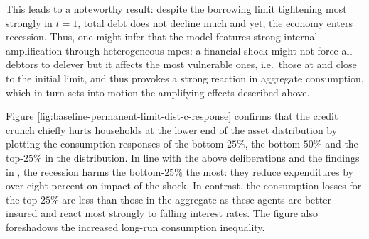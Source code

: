 \documentclass[a4paper,12pt]{article} %
\numberwithin{equation}{section} %
\numberwithin{figure}{section}
\numberwithin{table}{section}
\begin{document}

This leads to a noteworthy result: despite the borrowing limit tightening most strongly in $t=1$, total debt does not decline much and yet, the economy enters recession. Thus, one might infer that the model features strong internal amplification through heterogeneous \Gls{mpc}s: a financial shock might not force all debtors to delever but it affects the most vulnerable ones, i.e.~those at and close to the initial limit, and thus provokes a strong reaction in aggregate consumption, which in turn sets into motion the amplifying effects described above.

Figure \ref{fig:baseline-permanent-limit-dist-c-response} confirms that the credit crunch chiefly hurts households at the lower end of the asset distribution by plotting the consumption responses of the bottom-$25\%$, the bottom-$50\%$ and the top-$25\%$ in the distribution. In line with the above deliberations and the findings in \textcite{gl2017}, the recession harms the bottom-$25\%$ the most: they reduce expenditures by over eight percent on impact of the shock. In contrast, the consumption losses for the top-$25\%$ are less than those in the aggregate as these agents are better insured and react most strongly to falling interest rates. The figure also foreshadows the increased long-run consumption inequality.
\end{document}

